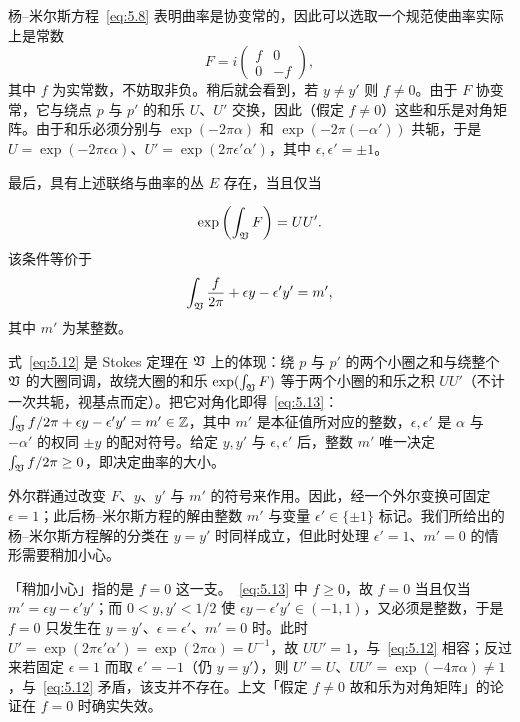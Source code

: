 杨–米尔斯方程~\eqref{eq:5.8} 表明曲率是协变常的，因此可以选取一个规范使曲率实际上是常数
\setcounter{equation}{10}
\begin{equation}\label{eq:5.11}
  F=i\left(\begin{matrix}f & 0\\ 0 &
-f\end{matrix}\right),
\end{equation}
 其中 $f$ 为实常数，不妨取非负。稍后就会看到，若 $y\not=
y'$ 则 $f\not=0$。由于 $F$ 协变常，它与绕点 $p$ 与 $p'$ 的和乐 $U$、$U'$ 交换，因此（假定 $f\not=0$）这些和乐是对角矩阵。由于和乐必须分别与 $\exp(-2\pi\alpha)$ 和 $\exp(-2\pi (-\alpha'))$ 共轭，于是 $U=\exp(- 2\pi\epsilon \alpha)$、$U'=\exp(2\pi\epsilon'\alpha')$，其中 $\epsilon,\epsilon'=\pm 1$。

最后，具有上述联络与曲率的丛 $E$ 存在，当且仅当

\setcounter{equation}{11}
\begin{equation}\label{eq:5.12}
  \exp\left(\int_{\mathfrak{V}}F\right)=UU'.
\end{equation}
 该条件等价于
\setcounter{equation}{12}
\begin{equation}\label{eq:5.13}
  \int_{\mathfrak{V}}{f\over 2\pi}+\epsilon
y-\epsilon' y'= m',
\end{equation}
 其中 $m'$ 为某整数。

\begin{yizhu}[物理图像补充]
式~\eqref{eq:5.12} 是 Stokes 定理在 $\mathfrak{V}$ 上的体现：绕 $p$ 与 $p'$ 的两个小圈之和与绕整个 $\mathfrak{V}$ 的大圈同调，故绕大圈的和乐 $\exp(\int_{\mathfrak{V}}F)$ 等于两个小圈的和乐之积 $UU'$（不计一次共轭，视基点而定）。把它对角化即得~\eqref{eq:5.13}：$\int_{\mathfrak{V}}f/2\pi+\epsilon y-\epsilon'y'=m'\in{\mathbb{Z}}$，其中 $m'$ 是本征值所对应的整数，$\epsilon,\epsilon'$ 是 $\alpha$ 与 $-\alpha'$ 的权同 $\pm y$ 的配对符号。给定 $y,y'$ 与 $\epsilon,\epsilon'$ 后，整数 $m'$ 唯一决定 $\int_{\mathfrak{V}}f/2\pi\ge 0$，即决定曲率的大小。
\end{yizhu}

外尔群通过改变 $F$、$y$、$y'$ 与 $m'$ 的符号来作用。因此，经一个外尔变换可固定 $\epsilon=1$；此后杨–米尔斯方程的解由整数 $m'$ 与变量 $\epsilon'\in\{\pm 1\}$ 标记。我们所给出的杨–米尔斯方程解的分类在 $y=y'$ 时同样成立，但此时处理 $\epsilon'=1$、$m'=0$ 的情形需要稍加小心。

\begin{yizhu}[含糊点拨]
「稍加小心」指的是 $f=0$ 这一支。~\eqref{eq:5.13} 中 $f\ge 0$，故 $f=0$ 当且仅当 $m'=\epsilon y-\epsilon'y'$；而 $0<y,y'<1/2$ 使 $\epsilon y-\epsilon'y'\in(-1,1)$，又必须是整数，于是 $f=0$ 只发生在 $y=y'$、$\epsilon=\epsilon'$、$m'=0$ 时。此时 $U'=\exp(2\pi\epsilon'\alpha')=\exp(2\pi\alpha)=U^{-1}$，故 $UU'=1$，与~\eqref{eq:5.12} 相容；反过来若固定 $\epsilon=1$ 而取 $\epsilon'=-1$（仍 $y=y'$），则 $U'=U$、$UU'=\exp(-4\pi\alpha)\ne 1$，与~\eqref{eq:5.12} 矛盾，该支并不存在。上文「假定 $f\ne 0$ 故和乐为对角矩阵」的论证在 $f=0$ 时确实失效。
\end{yizhu}

